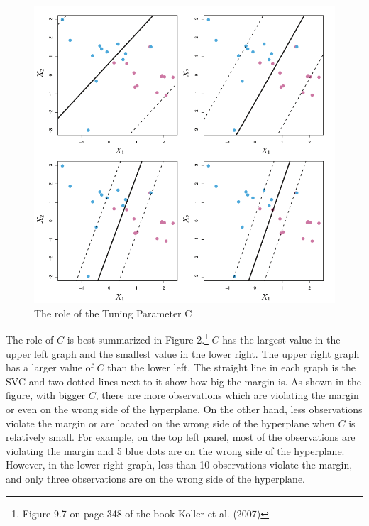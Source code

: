 \documentclass[11pt,a4paper,oneside]{article}
\begin{document}
\begin{figure}[t!]
    \centering
    \includegraphics[scale = 0.5]{Figures/figure2.png}
    \caption{The role of the Tuning Parameter C}
    \label{fig:figure2}
\end{figure}

\par
The role of $C$ is best summarized in Figure 2.\footnote{Figure 9.7 on page 348 of the book Koller et al. (2007)\cite{koller2007introduction}} $C$ has the largest value in the upper left graph and the smallest value in the lower right. The upper right graph has a larger value of $C$ than the lower left. The straight line in each graph is the SVC and two dotted lines next to it show how big the margin is. As shown in the figure, with bigger $C$, there are more observations which are violating the margin or even on the wrong side of the hyperplane. On the other hand, less observations violate the margin or are located on the wrong side of the hyperplane when $C$ is relatively small. For example, on the top left panel, most of the observations are violating the margin and 5 blue dots are on the wrong side of the hyperplane. However, in the lower right graph, less than 10 observations violate the margin, and only three observations are on the wrong side of the hyperplane.
\end{document}
